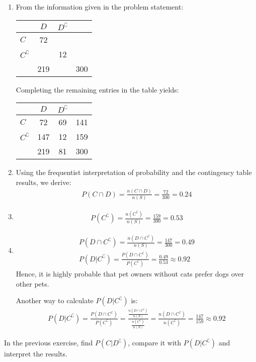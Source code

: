 \begin{solution}
	\begin{enumerate}
		\item From the information given in the problem statement:
		\begin{center}
		\begin{tabular}{l|cc|c}
							& \( D \) & \( D^\complement \) &  \\ \hline
		\( C \)                & 72 & & \\ 
		\( C^\complement \)    & & 12 &  \\ \hline
							& 219 &  & 300
		\end{tabular}
		\end{center}
		Completing the remaining entries in the table yields:
		\begin{center}
		\begin{tabular}{l|cc|c}
							& \( D \) & \( D^\complement \) &  \\ \hline
		\( C \)                & 72 & 69 & 141 \\ 
		\( C^\complement \)    & 147 & 12 & 159  \\ \hline
							& 219 & 81 & 300
		\end{tabular}
		\end{center}
		\item Using the frequentist interpretation of probability and the contingency table results, we derive:
		\begin{align*}
			P(C \cap D) = \frac{n(C \cap D)}{n(S)} = \frac{72}{300} = 0.24
		\end{align*}
		\item \begin{align*}
			P(C^\complement) = \frac{n(C^\complement)}{n(S)} = \frac{159}{300} = 0.53
		\end{align*}
		\item \begin{gather*}
			P(D \cap C^\complement) = \frac{n(D \cap C^\complement)}{n(S)} = \frac{147}{300} = 0.49\\
			P(D | C^\complement) = \frac{P(D \cap C^\complement)}{P(C^\complement)} = \frac{0.49}{0.53} \approx 0.92
		\end{gather*}
		Hence, it is highly probable that pet owners without cats prefer dogs over other pets.

		Another way to calculate \( P(D | C^\complement) \) is:
		\begin{align*}
			P(D | C^\complement) = \frac{P(D \cap C^\complement)}{P(C^\complement)} = \frac{\frac{n(D \cap C^\complement)}{n(S)}}{\frac{n(C^\complement)}{n(S)}} = \frac{n(D \cap C^\complement)}{n(C^\complement)} = \frac{147}{159} \approx 0.92
		\end{align*}
	\end{enumerate}
\end{solution}
\begin{ex}
	In the previous exercise, find \( P(C | D^\complement) \), compare it with \( P(D | C^\complement) \) and interpret the results.
\end{ex}

